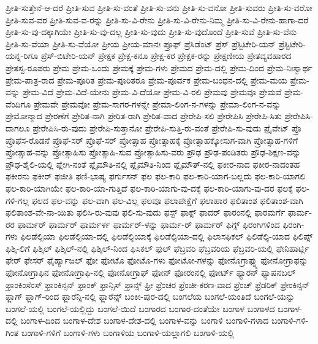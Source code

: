 {ಪ್ರೀತಿ-ಸುತ್ತೇನೆ-ಆ-ದರೆ
ಪ್ರೀತಿ-ಸುವ
ಪ್ರೀತಿ-ಸು-ವಂತೆ
ಪ್ರೀತಿ-ಸು-ವನು
ಪ್ರೀತಿ-ಸು-ವನೋ
ಪ್ರೀತಿ-ಸುವರು
ಪ್ರೀತಿ-ಸು-ವರೋ
ಪ್ರೀತಿ-ಸುವ-ವರ
ಪ್ರೀತಿ-ಸುವ-ವ-ರನ್ನು
ಪ್ರೀತಿ-ಸು-ವಿ-ರೇನು
ಪ್ರೀತಿ-ಸು-ವಿ-ರೇನು-ನಿಮ್ಮ
ಪ್ರೀತಿ-ಸು-ವಿ-ರೇನು-ಹಾಗಾ-ದರೆ
ಪ್ರೀತಿ-ಸು-ವು-ದಕ್ಕಾಗಿಯೇ
ಪ್ರೀತಿ-ಸು-ವು-ದಲ್ಲ
ಪ್ರೀತಿ-ಸು-ವುದು
ಪ್ರೀತಿ-ಸು-ವುದೊಂದೆ
ಪ್ರೀತಿ-ಸುವೆ
ಪ್ರೀತಿ-ಸು-ವೆನು
ಪ್ರೀತಿ-ಸು-ವೆಯಾ
ಪ್ರೀತಿ-ಸು-ವೆಯೋ
ಪ್ರೀಯ
ಪ್ರೀಯ-ಮಾನಃ
ಪ್ರೂಫ್
ಪ್ರೆಸಿಡೆಂಟ್
ಪ್ರೆಸ್
ಪ್ರೆಸ್ಬಿಟೇರಿ-ಯನ್
ಪ್ರೆಸ್ಬಿಟೇರಿ-ಯನ್ನ-ರಿಗೂ
ಪ್ರೆಸ್-ಬಿಟೇರಿ-ಯನ್
ಪ್ರೇಕ್ಷಕ
ಪ್ರೇಕ್ಷ-ಕನೂ
ಪ್ರೇಕ್ಷ-ಕರ
ಪ್ರೇಕ್ಷಕ-ರನ್ನು
ಪ್ರೇಕ್ಷಣೀಯ
ಪ್ರೇತವ್ಯವಹಾರದ
ಪ್ರೇತಸ್ವ-ರೂಪರು
ಪ್ರೇಮ
ಪ್ರೇಮ-ಒಂದು
ಪ್ರೇಮಕ್ಕೆ
ಪ್ರೇಮ-ಗಳು
ಪ್ರೇಮದ
ಪ್ರೇಮ-ದಲ್ಲಿ
ಪ್ರೇಮ-ದಿಂದ
ಪ್ರೇಮ-ನಿಃಸ್ವಾರ್ಥ
ಪ್ರೇಮ-ಪಾತ್ರ-ರಾದ
ಪ್ರೇಮ-ಪೂರಿತ
ಪ್ರೇಮ-ಪೂರಿತರೂ
ಪ್ರೇಮ-ಪೂರ್ವಕ
ಪ್ರೇಮ-ಬಂಧನ-ದಲ್ಲಿ
ಪ್ರೇಮ-ಮಯ
ಪ್ರೇಮ-ವನ್ನು
ಪ್ರೇಮ-ವಿದೆ
ಪ್ರೇಮ-ವಿದೆ-ಯೇನು
ಪ್ರೇಮ-ವಿ-ದೆಯೋ
ಪ್ರೇಮ-ವಿ-ರಲಿ
ಪ್ರೇಮವು
ಪ್ರೇಮವೂ
ಪ್ರೇಮವೆ
ಪ್ರೇಮ-ವೆಂದಿಗೂ
ಪ್ರೇಮವೇ
ಪ್ರೇಮವೋ
ಪ್ರೇಮ-ಸಾಗರ-ಗಳನ್ನೇ
ಪ್ರೇಮಾ-ಲಿಂಗ-ನ-ಗಳನ್ನು
ಪ್ರೇಮಾ-ಲಿಂಗ-ನ-ವನ್ನು
ಪ್ರೇಮೋನ್ಮಾದ
ಪ್ರೇರಣೆಗೆ
ಪ್ರೇರಿತ-ನಾಗಿ
ಪ್ರೇರಿತ-ರಾಗಿ
ಪ್ರೇರಿತ-ವಾದ
ಪ್ರೇರೇಪಿ-ಸಲಿ
ಪ್ರೇರೇಪಿಸಿ
ಪ್ರೇರೇಪಿ-ಸಿತು
ಪ್ರೇರೇಪಿಸಿ-ದಾಗಲೂ
ಪ್ರೇರೇಪಿಸಿ-ರು-ವುದು
ಪ್ರೇರೇಪಿ-ಸುತ್ತಾನೋ
ಪ್ರೇರೇಪಿ-ಸುತ್ತಿ-ರು-ವಂತೆ
ಪ್ರೇರೇಪಿ-ಸು-ವುದು
ಪ್ರೈವೇಟ್
ಪ್ರೊ
ಪ್ರೊಫೆಸ-ರೊಡನೆ
ಪ್ರೊಫೆ-ಸರ್
ಪ್ರೊಫೆ-ಸರ್
ಪ್ರೋತ್ಸಾಹ
ಪ್ರೋತ್ಸಾಹಕ್ಕೆ
ಪ್ರೋತ್ಸಾಹಕ್ಕೋಸುಗ-ವಾಗಿ
ಪ್ರೋತ್ಸಾಹ-ಗಳಿಗೆ
ಪ್ರೋತ್ಸಾಹ-ವನ್ನು
ಪ್ರೋತ್ಸಾಹಿಸು
ಪ್ರೋತ್ಸಾಹಿ-ಸುವ
ಪ್ರೋತ್ಸಾಹಿಸು-ವರು
ಪ್ರೌಢ
ಪ್ರೌಢ-ಪಂಡಿತರು
ಪ್ರೌಢ-ಶಿಕ್ಷಣ-ವನ್ನು
ಪ್ರೌಢ-ಶೈಲಿ-ಯಲ್ಲಿ
ಪ್ಲೇಗಿ-ನಂತೆ
ಪ್ಲೈಮೌತಿ-ನಲ್ಲಿ
ಪ್ಲೈಮೌತಿ-ನಿಂದ
ಪ್ಲೈಮೌತ್-ನಲ್ಲಿ
ಫಕೀರ-ನಾದ
ಫಕೀರ-ನಾದಂತಹ
ಫಕೀರನು
ಫಕೀರ್
ಫಜೀತಿ
ಫಣಿ-ಭಾಷ್ಯ
ಫರ್ಗುಸನ್
ಫಲ
ಫಲ-ಕಾರಿ
ಫಲ-ಕಾರಿ-ಯಾಗ-ಬಲ್ಲದು
ಫಲ-ಕಾರಿ-ಯಾಗಲಿ
ಫಲ-ಕಾರಿ-ಯಾಗಿಯೇ
ಫಲ-ಕಾರಿ-ಯಾ-ಗುತ್ತಿದೆ
ಫಲ-ಕಾರಿ-ಯಾಗು-ವು-ದಕ್ಕೆ
ಫಲ-ಕಾರಿ-ಯಾಗು-ವು-ದರ
ಫಲಕ್ಕೆ
ಫಲ-ಗಳಿ-ಗಲ್ಲ
ಫಲದ
ಫಲ-ವನ್ನು
ಫಲ-ವಾಗಿ
ಫಲ-ವಿಲ್ಲ
ಫಲವೂ
ಫಲಾಪೇಕ್ಷೆಗೆ
ಫಲಾಹಾರ
ಫಲಿತಾಂಶ
ಫಲಿತಾಂಶ-ವಾಗಿ
ಫಲಿತಾಂಶ-ವೇ-ನಾ-ಯಿತು
ಫಲಿಸಿ-ರು-ವುವು
ಫಲಿ-ಸು-ವುದು
ಫಸ್ಟ್
ಫಾಕ್ಸ್
ಫಾದರ್
ಫಾರಂನಲ್ಲಿ
ಫಾರಮರ್ಗೆ
ಫಾರ್ಮ-ರರ
ಫಾರ್ಮರ್
ಫಾರ್ಮರ್
ಫಾರ್ಮರ್ಳ
ಫಾರ್ಮರ್-ಳನ್ನು
ಫಾರ್ಮ-ರ್
ಫಾರ್ಮರ್
ಫಿಗ್ಸ್
ಫಿರಂಗಿಗಳಿಂದ
ಫಿರಂಗಿ-ಗಳು
ಫಿಲಡೆಲ್ಪಿಯಾ
ಫಿಲಡೆಲ್ಪಿಯಾ-ದಲ್ಲಿ
ಫಿಲಡೆಲ್ಫಿಯಾಕ್ಕೆ
ಫಿಲಡೆಲ್ಫಿಯಾ-ದಲ್ಲಿ
ಫಿಲಾಸಫಿಕಲ್
ಫಿಲಿಡೆಲ್ಫಿ-ಯಾದ
ಫಿಲಿಪ್ಸ್
ಫಿಶ್ಕಿ-ಲಿಗೆ
ಫಿಶ್ಕಿಲ್
ಫಿಶ್ಕಿಲ್-ನಲ್ಲಿ
ಫಿಶ್ಕಿಲ್-ನಿಂದ
ಫಿಸಿಕಲ್
ಫುಲ್
ಫೆಬ್ರವರಿ
ಫೆಬ್ರವರಿಯ
ಫೆಬ್ರವರಿ-ಯಲ್ಲಿ
ಫೇನಿಹಾರ್ಟ್ಲಿ
ಫೇರ್
ಫೇಸರ್
ಫೈರ್ಹ್ಯಾಜಲ್
ಫೋ
ಫೋಟೊ
ಫೋಟೊ-ಗಳು
ಫೋಟೋ-ಗಳನ್ನು
ಫೋನೊಗ್ರಾಫ್ನ್ನು
ಫೋನೋಗ್ರಾಫನ್ನು
ಫೋನೋಗ್ರಾಫಿನ
ಫೋನೋಗ್ರಾಫಿ-ನಲ್ಲಿ
ಫೋನೋಗ್ರಾಫ್
ಫೋನ್
ಫೋರಂನಲ್ಲಿ
ಫೋರ್ಟ್
ಫ್ಯಾರನ್
ಫ್ಯಾಷನಬಲ್
ಫ್ರಾಂಕಿಂಸೆಂಸ್
ಫ್ರಾಂಕಿನ್ಸನ್
ಫ್ರಾಂಕ್
ಫ್ರಾನ್ಸಿಸ್
ಫ್ರಾನ್ಸ್
ಫ್ರೀ
ಫ್ರೆಂಚರ
ಫ್ರೆಂಚೀ-ಕರಣ-ವಾದ
ಫ್ರೆಂಚ್
ಫ್ರೆಡರಿಕ್
ಫ್ರೇಂಕಿನ್ಸನ್
ಫ್ಲಾಗ್
ಫ್ಲಾಗ್-ರಿಂದ
ಫ್ಲಾರೆನ್ಸಿ-ನಲ್ಲಿ
ಫ್ಲಾರೆನ್ಸ್
ಬಂಕೀ-ಪುರ-ದಲ್ಲಿ
ಬಂಗಲೆಯ
ಬಂಗಲೆ-ಯಂತಿದೆ
ಬಂಗಲೆ-ಯನ್ನು
ಬಂಗಲೆ-ಯಲ್ಲಿ
ಬಂಗಲೆ-ಯಲ್ಲಿದ್ದು
ಬಂಗಲೆ-ಯಿದೆ
ಬಂಗಾರದ
ಬಂಗಾರ-ದಂತೆಯೇ
ಬಂಗಾಳ
ಬಂಗಾಳದ
ಬಂಗಾಳ-ದಲ್ಲಿ
ಬಂಗಾಳ-ದಿಂದ
ಬಂಗಾಳ-ದೇಶ
ಬಂಗಾಳ-ದೇಶ-ದಲ್ಲಿ
ಬಂಗಾಳ-ವನ್ನು
ಬಂಗಾಳಿ
ಬಂಗಾಳಿ-ಗಳಾದ
ಬಂಗಾಳಿ-ಗಳಿ-ಗಿಂತ
ಬಂಗಾಳಿ-ಗಳಿಗೆ
ಬಂಗಾಳಿ-ಗಳು
ಬಂಗಾಳಿಯ
ಬಂಗಾಳಿ-ಯಲ್ಲಾಗಲಿ
ಬಂಗಾಳಿ-ಯಲ್ಲಿ
}
